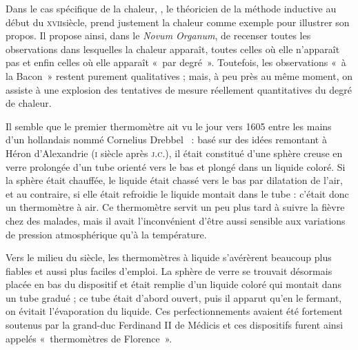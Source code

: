 	Dans le cas spécifique de la chaleur, , le théoricien de la méthode inductive au début du \textsc{xvii}\ieme siècle, prend justement la chaleur comme exemple pour illustrer son propos. Il propose ainsi, dans le \textit{Novum Organum}, de recenser toutes les observations dans lesquelles la chaleur apparaît, toutes celles où elle n'apparaît pas et enfin celles où elle apparaît «~par degré~».	Toutefois, les observations «~à la Bacon~» restent purement qualitatives ; mais, à peu près au même moment, on assiste à une explosion des tentatives de mesure réellement quantitatives du degré de chaleur.
	
	Il semble que le premier thermomètre ait vu le jour vers 1605 entre les mains d'un hollandais nommé Cornelius Drebbel~\cite{locqueneux1996} : basé sur des idées remontant à Héron d'Alexandrie (\textsc{i}\xspace siècle après \textsc{j.c.}), il était constitué d'une sphère creuse en verre prolongée d'un tube orienté vers le bas et plongé dans un liquide coloré. Si la sphère était chauffée, le liquide était chassé vers le bas par dilatation de l'air, et au contraire, si elle était refroidie le liquide montait dans le tube : c'était donc un thermomètre à air. Ce thermomètre servit un peu plus tard à suivre la fièvre chez des malades, mais il avait l'inconvénient d'être aussi sensible aux variations de pression atmosphérique qu'à la température. 
	
	Vers le milieu du siècle, les thermomètres à liquide s'avérèrent beaucoup plus fiables et aussi plus faciles d'emploi. La sphère de verre se trouvait désormais placée en bas du dispositif et était remplie d'un liquide coloré qui montait dans un tube gradué ; ce tube était d'abord ouvert, puis il apparut qu'en le fermant, on évitait l'évaporation du liquide. Ces perfectionnements avaient été fortement soutenus par la grand-duc Ferdinand II de Médicis et ces dispositifs furent ainsi appelés «~thermomètres de Florence~».
	
